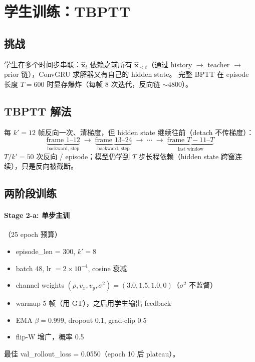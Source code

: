 \documentclass[11pt,a4paper]{ctexart}
\begin{document}
\section{学生训练：TBPTT}

\subsection{挑战}

学生在多个时间步串联：$\hat{\mathbf{x}}_t$ 依赖之前所有 $\hat{\mathbf{x}}_{<t}$（通过 history $\to$ teacher $\to$ prior 链），ConvGRU 求解器又有自己的 hidden state。
完整 BPTT 在 episode 长度 $T=600$ 时显存爆炸（每帧 8 次迭代，反向链 $\sim 4800$）。

\subsection{TBPTT 解法}

每 $k'=12$ 帧反向一次、清梯度，但 hidden state 继续往前（detach 不传梯度）：
\begin{equation*}
\underbrace{\text{frame } 1\text{--}12}_{\text{backward, step}}
\;\to\;
\underbrace{\text{frame } 13\text{--}24}_{\text{backward, step}}
\;\to\;
\cdots
\;\to\;
\underbrace{\text{frame } T-11\text{--}T}_{\text{last window}}
\end{equation*}
$T/k' = 50$ 次反向 / episode；模型仍学到 $T$ 步长程依赖（hidden state 跨窗连续），只是反向被截断。

\subsection{两阶段训练}

\paragraph{Stage 2-a: 单步主训}（25 epoch 预算）
\begin{itemize}
  \item episode\_len = 300, $k'=8$
  \item batch 48, lr $=2\times 10^{-4}$, cosine 衰减
  \item channel weights $(\rho, v_x, v_y, \sigma^2) = (3.0, 1.5, 1.0, 0)$（$\sigma^2$ 不监督）
  \item warmup 5 帧（用 GT），之后用学生输出 feedback
  \item EMA $\beta=0.999$, dropout 0.1, grad-clip 0.5
  \item flip-W 增广，概率 0.5
\end{itemize}
最佳 val\_rollout\_loss = 0.0550（epoch 10 后 plateau）。
\end{document}
